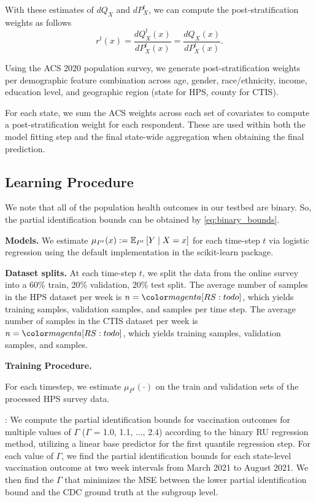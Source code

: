 With these estimates of $dQ_{X}$ and $dP^{t}_{X}$, we can compute the post-stratification weights as follows
\[ r^{t}(x) = \frac{dQ_{X}^{t}(x)}{dP_{X}^{t}(x)} = \frac{dQ_{X}(x)}{dP^{t}_{X}(x)}.\]

Using the ACS 2020 population survey, we generate post-stratification weights per demographic feature combination across age, gender, race/ethnicity, income, education level, and geographic region (state for HPS, county for CTIS).

For each state, we sum the ACS weights across each set of covariates to compute a post-stratification weight for each respondent. These are used within both the model fitting step and the final state-wide aggregation when obtaining the final prediction.

\subsection{Learning Procedure}
We note that all of the population health outcomes in our testbed are binary. So, the partial identification bounds can be obtained by \eqref{eq:binary_bounds}. 

\textbf{Models.}
We estimate $\mu_{P^{t}}(x):= \EE[P^{t}]{Y \mid X=x}$ for each time-step $t$ via logistic regression using the default implementation in the scikit-learn package.

\textbf{Dataset splits.} At each time-step $t$, we split the data from the online survey into a 60\% train, 20\% validation, 20\% test split. The average number of samples in the HPS dataset per week is $n= \rs{todo}$, which yields  training samples,  validation samples, and  samples per time step. The average number of samples in the CTIS dataset per week is $n=\rs{todo}$, which yields  training samples,  validation samples, and  samples.


\textbf{Training Procedure.}

For each timestep, we estimate $\mu_{P^{t}}(\cdot)$ on the train and validation sets of the processed HPS survey data. 


: We compute the partial identification bounds for vaccination outcomes for multiple values of $\Gamma$ ($\Gamma$ = 1.0, 1.1, ..., 2.4) according to the binary RU regression method, utilizing a linear base predictor for the first quantile regression step. For each value of $\Gamma$, we find the partial identification bounds for each state-level vaccination outcome at two week intervals from March 2021 to August 2021. We then find the $\Gamma$ that minimizes the MSE between the lower partial identification bound and the CDC ground truth at the subgroup level. 

